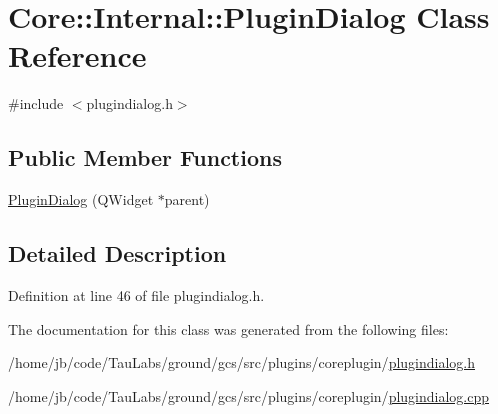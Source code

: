 \hypertarget{class_core_1_1_internal_1_1_plugin_dialog}{\section{\-Core\-:\-:\-Internal\-:\-:\-Plugin\-Dialog \-Class \-Reference}
\label{class_core_1_1_internal_1_1_plugin_dialog}
}


{\ttfamily \#include $<$plugindialog.\-h$>$}

\subsection*{\-Public \-Member \-Functions}
\begin{DoxyCompactItemize}
\item 
\hyperlink{group___core_plugin_ga2e7647eb2b6c3adf436dac649628b8cd}{\-Plugin\-Dialog} (\-Q\-Widget $\ast$parent)
\end{DoxyCompactItemize}


\subsection{\-Detailed \-Description}


\-Definition at line 46 of file plugindialog.\-h.



\-The documentation for this class was generated from the following files\-:\begin{DoxyCompactItemize}
\item 
/home/jb/code/\-Tau\-Labs/ground/gcs/src/plugins/coreplugin/\hyperlink{plugins_2coreplugin_2plugindialog_8h}{plugindialog.\-h}\item 
/home/jb/code/\-Tau\-Labs/ground/gcs/src/plugins/coreplugin/\hyperlink{plugins_2coreplugin_2plugindialog_8cpp}{plugindialog.\-cpp}\end{DoxyCompactItemize}
